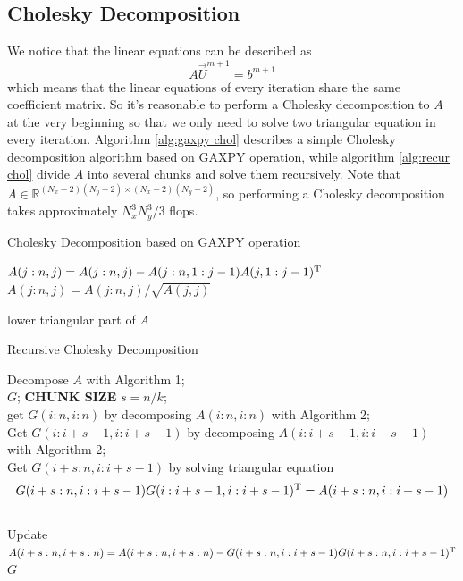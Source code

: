\documentclass[12pt]{article}
\begin{document}
\subsection{Cholesky Decomposition}
We notice that the linear equations can be described as 
$$
A\vec{U}^{m+1} = b^{m+1}
$$
which means that the linear equations of every iteration share the same coefficient matrix. So it's reasonable to perform a Cholesky decomposition to $A$ at the very beginning so that we only need to solve two triangular equation in every iteration. Algorithm \ref{alg:gaxpy chol} describes a simple Cholesky decomposition algorithm based on GAXPY operation, while algorithm \ref{alg:recur chol} divide $A$ into several chunks and solve them recursively. Note that $A \in \mathbb{R}^{(N_x-2)(N_y-2)\times(N_x-2)(N_y-2)}$, so performing a Cholesky decomposition takes approximately $N_x^3N_y^3/3$ flops.
\begin{algorithm}[!htb]
  \caption{Cholesky Decomposition based on GAXPY operation}  
\label{alg:gaxpy chol}
  { 
  	{
  		$A(j:n,j) = A(j:n,j) - A(j:n,1:j-1)A(j,1:j-1)^{\rm T}$
  	}
  	$A(j:n,j) = A(j:n,j)/\sqrt{A(j,j)}$
    
  }  
  \Return lower triangular part of $A$\;
\end{algorithm}

\begin{algorithm}[!htb]
  \caption{Recursive Cholesky Decomposition}  
  \label{alg:recur chol}
  {
  	Decompose $A$ with Algorithm 1;\\
  	\Return $G$;
  }
  \textbf{CHUNK SIZE} $s = n/k$;\\
  { 
  	{
  		get $G(i:n,i:n)$ by decomposing $A(i:n,i:n)$ with Algorithm 2;\\
  	}
  	Get $G(i:i+s-1,i:i+s-1)$ by decomposing $A(i:i+s-1,i:i+s-1)$ with Algorithm 2;\\
    Get $G(i+s:n,i:i+s-1)$ by solving triangular equation
    $$ G(i+s:n,i:i+s-1)G(i:i+s-1,i:i+s-1)^{\rm T} = A(i+s:n,i:i+s-1)$$\\
    Update $A(i+s:n,i+s:n) = A(i+s:n,i+s:n) - G(i+s:n,i:i+s-1)G(i+s:n,i:i+s-1)^{\rm T}$
  }
  \Return $G$\;
\end{algorithm}
\end{document}
